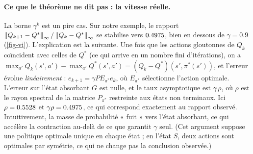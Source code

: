 \paragraph{Ce que le théorème ne dit pas : la vitesse réelle.} La borne $\gamma^k$ est un pire cas. Sur notre exemple, le rapport $\left\lVert Q_{k+1}-Q^* \right\rVert_\infty/\left\lVert Q_k-Q^* \right\rVert_\infty$ se stabilise vers $0.4975$, bien en dessous de $\gamma=0.9$ (\cref{fig-vi}). L'explication est la suivante. Une fois que les actions gloutonnes de $Q_k$ coïncident avec celles de $Q^*$ (ce qui arrive en un nombre fini d'itérations), on a $\max_{a'}Q_k(s',a')-\max_{a'}Q^*(s',a')=(Q_k-Q^*)(s',\pi^*(s'))$, et l'erreur évolue \emph{linéairement} : $e_{k+1}=\gamma PE_{\pi^*}e_k$, où $E_{\pi^*}$ sélectionne l'action optimale. L'erreur sur l'état absorbant $G$ est nulle, et le taux asymptotique est $\gamma\,\rho$, où $\rho$ est le rayon spectral de la matrice $P_{\pi^*}$ restreinte aux états non terminaux. Ici $\rho=0.5528$ et $\gamma\rho=0.4975$, ce qui correspond exactement au rapport observé. Intuitivement, la masse de probabilité « fuit » vers l'état absorbant, ce qui accélère la contraction au-delà de ce que garantit $\gamma$ seul. (Cet argument suppose une politique optimale unique en chaque état ; en l'état $S$, deux actions sont optimales par symétrie, ce qui ne change pas la conclusion observée.)
